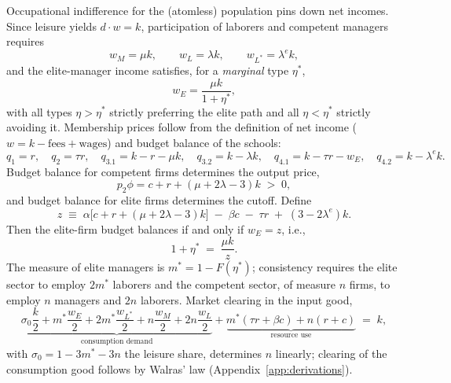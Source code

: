 \documentclass[12pt,letterpaper]{article}
\theoremstyle{definition}
\begin{document}
Occupational indifference for the (atomless) population pins down net incomes.
Since leisure yields $d\cdot w = k$, participation of laborers and competent managers requires
\begin{equation}\label{eq:wages}
  w_M = \mu k, \qquad w_L = \lambda k, \qquad w_{L^\ast} = \lambda^{e} k,
\end{equation}
and the elite-manager income satisfies, for a \emph{marginal} type $\eta^\ast$,
\begin{equation}\label{eq:cutoff}
  w_E = \frac{\mu k}{1+\eta^\ast},
\end{equation}
with all types $\eta>\eta^\ast$ strictly preferring the elite path and all $\eta<\eta^\ast$ strictly avoiding it.
Membership prices follow from the definition of net income ($w = k - \text{fees} + \text{wages}$) and budget balance of the schools:
\begin{equation}\label{eq:prices}
  q_1 = r,\quad q_2=\tau r,\quad
  q_{3.1} = k - r - \mu k,\quad
  q_{3.2} = k - \lambda k,\quad
  q_{4.1} = k - \tau r - w_E,\quad
  q_{4.2} = k - \lambda^{e} k .
\end{equation}
Budget balance for competent firms determines the output price,
\begin{equation}\label{eq:p2}
  p_2\phi = c + r + (\mu + 2\lambda - 3)k \;>\;0,
\end{equation}
and budget balance for elite firms determines the cutoff.
Define
\begin{equation}\label{eq:Z}
  z \;\equiv\; \alpha\big[c + r + (\mu+2\lambda-3)k\big] \;-\; \beta c \;-\; \tau r
  \;+\; (3 - 2\lambda^{e})k .
\end{equation}
Then the elite-firm budget balances if and only if $w_E = z$, i.e.,
\begin{equation}\label{eq:etastar}
  1+\eta^\ast \;=\; \frac{\mu k}{z}.
\end{equation}
The measure of elite managers is $m^\ast = 1-F(\eta^\ast)$; consistency requires the elite sector to employ $2m^\ast$ laborers and the competent sector, of measure $n$ firms, to employ $n$ managers and $2n$ laborers.
Market clearing in the input good,
\begin{equation}\label{eq:clearing}
  \underbrace{\sigma_0\frac{k}{2}
  + m^\ast\frac{w_E}{2} + 2m^\ast\frac{w_{L^\ast}}{2}
  + n\frac{w_M}{2} + 2n\frac{w_L}{2}}_{\text{consumption demand}}
  + \underbrace{m^\ast(\tau r + \beta c) + n(r+c)}_{\text{resource use}}
  \;=\; k,
\end{equation}
with $\sigma_0 = 1 - 3m^\ast - 3n$ the leisure share, determines $n$ linearly; clearing of the consumption good follows by Walras' law (Appendix~\ref{app:derivations}).
\end{document}
